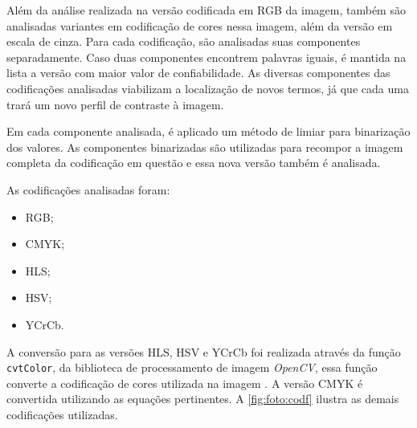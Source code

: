 Além da análise realizada na versão codificada em \ac{RGB} da imagem, também são analisadas variantes em codificação de cores nessa imagem, além da versão em escala de cinza.
Para cada codificação, são analisadas suas componentes separadamente.
Caso duas componentes encontrem palavras iguais, é mantida na lista a versão com maior valor de confiabilidade.
As diversas componentes das codificações analisadas viabilizam a localização de novos termos, já que cada uma trará um novo perfil de contraste à imagem.

Em cada componente analisada, é aplicado um método de limiar para binarização dos valores.
As componentes binarizadas são utilizadas para recompor a imagem completa da codificação em questão e essa nova versão também é analisada.

As codificações analisadas foram:
\begin{itemize}
    \item \ac{RGB};
    \item \ac{CMYK};
    \item HLS;
    \item HSV;
    \item YCrCb.
\end{itemize}

A conversão para as versões HLS, HSV e YCrCb foi realizada através da função \lstinline|cvtColor|, da biblioteca de processamento de imagem \textit{OpenCV}, essa função converte a codificação de cores utilizada na imagem \cite{CV2cvtColor}.
A versão \ac{CMYK} é convertida utilizando as equações pertinentes.
A \autoref{fig:foto:codf} ilustra as demais codificações utilizadas.

